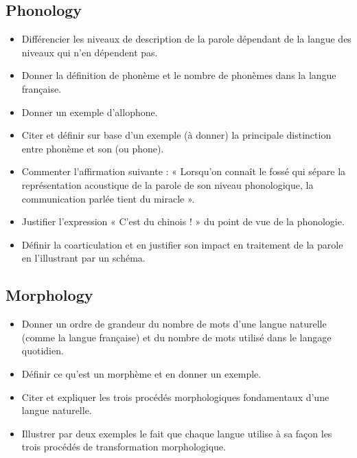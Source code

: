\documentclass[letterpaper, 12pt]{article}
\begin{document}
	\subsection{Phonology}
	\begin{itemize}
		\setlength{\itemsep}{0pt}		
		\setlength{\parskip}{0pt}		
		\setlength{\parsep}{0pt}	
		\item Différencier les niveaux de description de la parole dépendant de la langue des niveaux qui n'en 
			dépendent pas.
		\item Donner la définition de phonème et le nombre de phonèmes dans la langue française.
		\item Donner un exemple d'allophone.
		\item Citer et définir sur base d'un exemple (à donner) la principale distinction entre phonème et son (ou 
			phone).
		\item Commenter l'affirmation suivante : « Lorsqu'on connaît le fossé qui sépare la représentation acoustique 
			de la parole de son niveau phonologique, la communication parlée tient du miracle ».
		\item Justifier l'expression « C'est du chinois ! » du point de vue de la phonologie.
		\item Définir la coarticulation et en justifier son impact en traitement de la parole en l'illustrant par un 
			schéma.
	\end{itemize}
	\subsection{Morphology}
	\begin{itemize}
		\setlength{\itemsep}{0pt}		
		\setlength{\parskip}{0pt}		
		\setlength{\parsep}{0pt}	
		\item Donner un ordre de grandeur du nombre de mots d'une langue naturelle (comme la langue française) et du 
			nombre de mots utilisé dans le langage quotidien.
    	\item Définir ce qu'est un morphème et en donner un exemple.
    	\item Citer et expliquer les trois procédés morphologiques fondamentaux d'une langue naturelle.
    	\item Illustrer par deux exemples le fait que chaque langue utilise à sa façon les trois procédés de 
    		transformation morphologique.
	\end{itemize}
\end{document}

